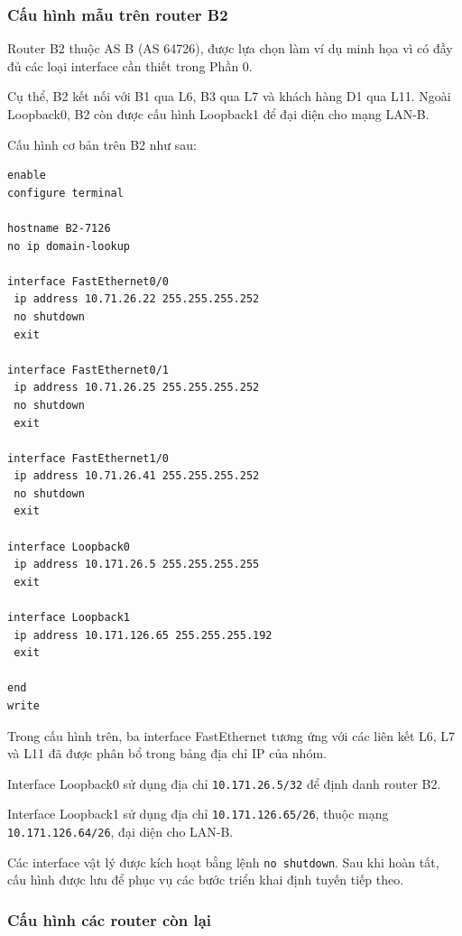 
\subsubsection{Cấu hình mẫu trên router B2}

Router B2 thuộc AS B (AS 64726),
được lựa chọn làm ví dụ minh họa
vì có đầy đủ các loại interface
cần thiết trong Phần 0.

Cụ thể, B2 kết nối với B1 qua L6,
B3 qua L7 và khách hàng D1 qua L11.
Ngoài Loopback0, B2 còn được cấu hình
Loopback1 để đại diện cho mạng LAN-B.

Cấu hình cơ bản trên B2 như sau:

\begin{lstlisting}
enable
configure terminal

hostname B2-7126
no ip domain-lookup

interface FastEthernet0/0
 ip address 10.71.26.22 255.255.255.252
 no shutdown
 exit

interface FastEthernet0/1
 ip address 10.71.26.25 255.255.255.252
 no shutdown
 exit

interface FastEthernet1/0
 ip address 10.71.26.41 255.255.255.252
 no shutdown
 exit

interface Loopback0
 ip address 10.171.26.5 255.255.255.255
 exit

interface Loopback1
 ip address 10.171.126.65 255.255.255.192
 exit

end
write
\end{lstlisting}

Trong cấu hình trên, ba interface
FastEthernet tương ứng với các liên kết
L6, L7 và L11 đã được phân bổ trong
bảng địa chỉ IP của nhóm.

Interface Loopback0 sử dụng địa chỉ
\texttt{10.171.26.5/32} để định danh
router B2.

Interface Loopback1 sử dụng địa chỉ
\texttt{10.171.126.65/26},
thuộc mạng \texttt{10.171.126.64/26},
đại diện cho LAN-B.

Các interface vật lý được kích hoạt
bằng lệnh \texttt{no shutdown}.
Sau khi hoàn tất, cấu hình được lưu
để phục vụ các bước triển khai
định tuyến tiếp theo.



\subsubsection{Cấu hình các router còn lại}

